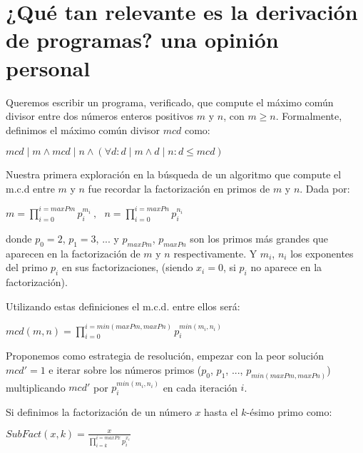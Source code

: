 \documentclass[12pt, a4paper, openany, fleqn]{book}
\begin{document}
    \section{¿Qué tan relevante es la derivación de programas? una opinión personal}
    Queremos escribir un programa, verificado, que compute el máximo común divisor entre dos números enteros positivos $m$ y $n$, con $m \geqslant n$. Formalmente, definimos el máximo común divisor $mcd$ como:

    \begin{center}
        \begin{math}
            mcd \mid m \land mcd \mid n \land (\forall d: d \mid m \land d \mid n : d \leq mcd)
        \end{math}
    \end{center}

    Nuestra primera exploración en la búsqueda de un algoritmo que compute el m.c.d entre $m$ y $n$ fue recordar la factorización en primos de $m$ y $n$. Dada por:

    \begin{center}
        \begin{math}
            m = \prod_{i=0}^{i=maxPm} p_{i}^{m_i}\ , \ \ \ n = \prod_{i=0}^{i=maxPn} p_{i}^{n_i}
        \end{math}
    \end{center}

    donde $p_0=2$, $p_1= 3$, ... y $p_{maxPm}$, $p_{maxPn}$ son los primos más grandes que aparecen en la factorización de $m$ y $n$ respectivamente. Y $m_i$, $n_i$ los exponentes del primo $p_i$ en sus factorizaciones, (siendo $x_i=0$, si $p_i$ no aparece en la factorización).

    Utilizando estas definiciones el m.c.d. entre ellos será:

    \begin{center}
        \begin{math}
            mcd(m, n) = \prod_{i=0}^{i=min(maxPm, maxPn)} p_{i}^{min(m_i, n_i)}
        \end{math}
    \end{center}

    Proponemos como estrategia de resolución, empezar con la peor solución $mcd' = 1$ e iterar sobre los números primos ($p_0$, $p_1$, ..., $p_{min(maxPm, maxPn)}$) multiplicando $mcd'$ por $p_{i}^{min(m_{i}, n_{i})}$ en cada iteración $i$.

    Si definimos la factorización de un número $x$ hasta el $k$-ésimo primo como:
    \begin{center}
        \begin{math}
            SubFact(x, k) = \frac{x}{\prod_{i=k}^{i=maxPx} p_{i}^{x_i}} 
        \end{math}
    \end{center}
\end{document}
